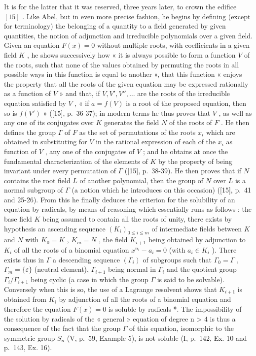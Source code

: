 It is for the latter that it was reserved, three years later, to crown the edifice \([15]\) . Like Abel, but in even more precise fashion, he begins by defining (except for terminology) the belonging of a quantity to a field generated by given quantities, the notion of adjunction and irreducible polynomials over a given field. Given an equation \(F(x) = 0\) without multiple roots, with coefficients in a given field \(K\) , he shows successively how « it is always possible to form a function \(V\) of the roots, such that none of the values obtained by permuting the roots in all possible ways in this function is equal to another », that this function « enjoys the property that all the roots of the given equation may be expressed rationally as a function of \(V\) » and that, if \(V, V', V'', \ldots\) are the roots of the irreducible equation satisfied by \(V\) , « if \(a = f(V)\) is a root of the proposed equation, then so is \(f(V')\) » ({[}15{]}, p.~36-37); in modern terms he thus proves that \(V\) , as well as any one of its conjugates over \(K\) generates the field \(N\) of the roots of \(F\) . He then defines the group \(\Gamma\) of \(F\) as the set of permutations of the roots \(x_i\) which are obtained in substituting for \(V\) in the rational expression of each of the \(x_i\) as function of \(V\) , any one of the conjugates of \(V\) ; and he obtains at once the fundamental characterization of the elements of \(K\) by the property of being invariant under every permutation of \(\Gamma\) ({[}15{]}, p.~38-39). He then proves that if \(N\) contains the root field \(L\) of another polynomial, then the group of \(N\) over \(L\) is a normal subgroup of \(\Gamma\) (a notion which he introduces on this occasion) ({[}15{]}, p.~41 and 25-26). From this he finally deduces the criterion for the solubility of an equation by radicals, by means of reasoning which essentially runs as follows : the base field \(K\) being assumed to contain all the roots of unity, there exists by hypothesis an ascending sequence \((K_i)_{0 \leq i \leq m}\) of intermediate fields between \(K\) and \(N\) with \(K_0 = K\) , \(K_m = N\) , the field \(K_{i+1}\) being obtained by adjunction to \(K_i\) of all the roots of a binomial equation \(x^{n_i} - a_i = 0\) (with \(a_i \in K_i\) ). There exists thus in \(\Gamma\) a descending sequence \((\Gamma_i)\) of subgroups such that \(\Gamma_0 = \Gamma\) , \(\Gamma_m = \{\varepsilon\}\) (neutral element), \(\Gamma_{i+1}\) being normal in \(\Gamma_i\) and the quotient group \(\Gamma_i / \Gamma_{i+1}\) being cyclic (a case in which the group \(\Gamma\) is said to be solvable). Conversely when this is so, the use of a Lagrange resolvent shows that \(K_{i+1}\) is obtained from \(K_i\) by adjunction of all the roots of a binomial equation and therefore the equation \(F(x) = 0\) is soluble by radicals *. The impossibility of the solution by radicals of the « general » equation of degree n \textgreater{} 4 is thus a consequence of the fact that the group \(\Gamma\) of this equation, isomorphic to the symmetric group \(S_n\) (V, p.~59, Example 5), is not soluble (I, p.~142, Ex. 10 and p.~143, Ex. 16).

